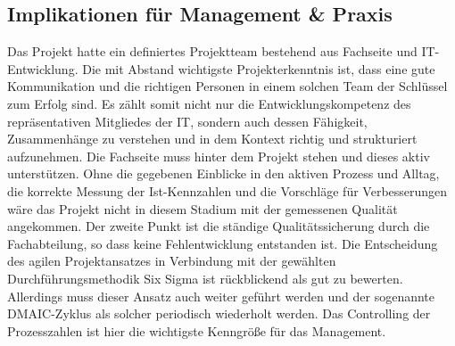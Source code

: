 \subsection{Implikationen für Management \& Praxis}
Das Projekt hatte ein definiertes Projektteam bestehend aus Fachseite und IT-Entwicklung. Die mit Abstand wichtigste Projekterkenntnis ist, dass eine gute Kommunikation und die richtigen Personen in einem solchen Team der Schlüssel zum Erfolg sind. Es zählt somit nicht nur die Entwicklungskompetenz des repräsentativen Mitgliedes der IT, sondern auch dessen Fähigkeit, Zusammenhänge zu verstehen und in dem Kontext richtig und strukturiert aufzunehmen. Die Fachseite muss hinter dem Projekt stehen und dieses aktiv unterstützen. Ohne die gegebenen Einblicke in den aktiven Prozess und Alltag, die korrekte Messung der Ist-Kennzahlen und die Vorschläge für Verbesserungen wäre das Projekt nicht in diesem Stadium mit der gemessenen Qualität angekommen. Der zweite Punkt ist die ständige Qualitätssicherung durch die Fachabteilung, so dass keine Fehlentwicklung entstanden ist. Die Entscheidung des agilen Projektansatzes in Verbindung mit der gewählten Durchführungsmethodik Six Sigma ist rückblickend als gut zu bewerten. Allerdings muss dieser Ansatz auch weiter geführt werden und der sogenannte DMAIC-Zyklus als solcher periodisch wiederholt werden. Das Controlling der Prozesszahlen ist hier die wichtigste Kenngröße für das Management. 



